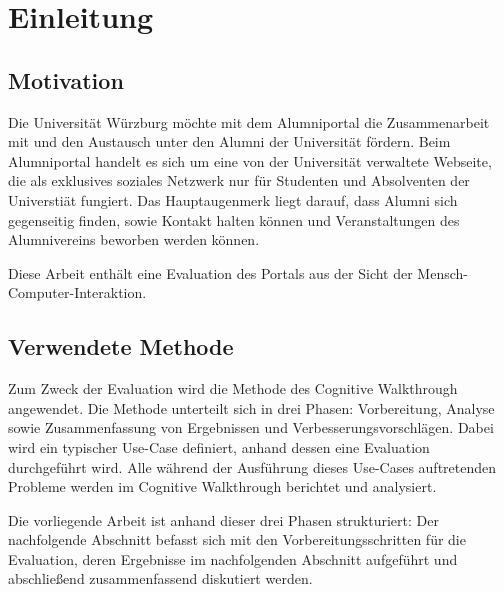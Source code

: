 \section{Einleitung}
\subsection{Motivation}
Die Universität Würzburg möchte mit dem Alumniportal die Zusammenarbeit mit und den Austausch unter den Alumni der Universität fördern. 
Beim Alumniportal handelt es sich um eine von der Universität verwaltete Webseite, die als exklusives soziales Netzwerk nur für Studenten und Absolventen der Universtiät fungiert. 
Das Hauptaugenmerk liegt darauf, dass Alumni sich gegenseitig finden, sowie Kontakt halten können und Veranstaltungen des Alumnivereins beworben werden können. 

Diese Arbeit enthält eine Evaluation des Portals aus der Sicht der Mensch-Computer-Interaktion. 

\subsection{Verwendete Methode}
Zum Zweck der Evaluation wird die Methode des Cognitive Walkthrough angewendet.
Die Methode unterteilt sich in drei Phasen: Vorbereitung, Analyse sowie Zusammenfassung von Ergebnissen und Verbesserungsvorschlägen. 
Dabei wird ein typischer Use-Case definiert, anhand dessen eine Evaluation durchgeführt wird. Alle während der Ausführung dieses Use-Cases auftretenden Probleme werden im Cognitive Walkthrough berichtet und analysiert.

Die vorliegende Arbeit ist anhand dieser drei Phasen strukturiert: Der nachfolgende Abschnitt befasst sich mit den Vorbereitungsschritten für die Evaluation, deren Ergebnisse im nachfolgenden Abschnitt aufgeführt und abschließend zusammenfassend diskutiert werden.